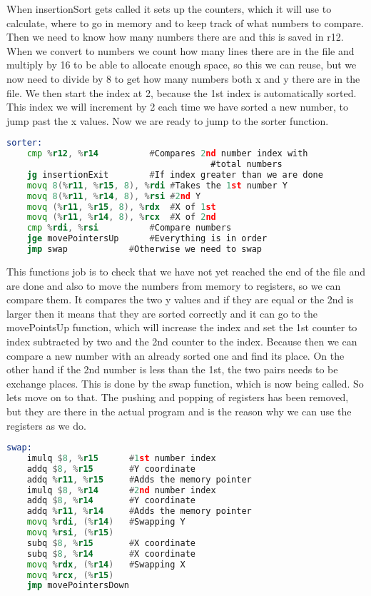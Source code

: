 \documentclass{article}
\begin{document}
When insertionSort gets called it sets up the counters, which it will use to calculate, where to  go in memory and to keep track of what numbers to compare. Then we need to know how many numbers there are and this is saved in r12. When we convert to numbers we count how many lines there are in the file and multiply by 16 to be able to allocate enough space, so this we can reuse, but we now need to divide by 8 to get how many numbers both x and y there are in the file. We then start the index at 2, because the 1st index is automatically sorted. This index we will increment by 2 each time we have sorted a new number, to jump past the x values. Now we are ready to jump to the sorter function.

\begin{lstlisting}[language=asm]
sorter:
	cmp %r12, %r14			#Compares 2nd number index with 
                                        #total numbers
	jg insertionExit		#If index greater than we are done
	movq 8(%r11, %r15, 8), %rdi	#Takes the 1st number Y
	movq 8(%r11, %r14, 8), %rsi	#2nd Y
	movq (%r11, %r15, 8), %rdx	#X of 1st
	movq (%r11, %r14, 8), %rcx	#X of 2nd
	cmp %rdi, %rsi			#Compare numbers
	jge movePointersUp		#Everything is in order
	jmp swap			#Otherwise we need to swap
\end{lstlisting}

This functions job is to check that we have not yet reached the end of the file and are done and also to move the numbers from memory to registers, so we can compare them. It compares the two y values and if they are equal or the 2nd is larger then it means that they are sorted correctly and it can go to the movePointsUp function, which will increase the index and set the 1st counter to index subtracted by two and the 2nd counter to the index. Because then we can compare a new number with an already sorted one and find its place. On the other hand if the 2nd number is less than the 1st, the two pairs needs to be exchange places. This is done by the swap function, which is now being called. So lets move on to that. The pushing and popping of registers has been removed, but they are there in the actual program and is the reason why we can use the registers as we do.

\begin{lstlisting}[language=asm]
swap:
	imulq $8, %r15 	    #1st number index
	addq $8, %r15	    #Y coordinate
	addq %r11, %r15	    #Adds the memory pointer
	imulq $8, %r14	    #2nd number index
	addq $8, %r14       #Y coordinate
	addq %r11, %r14	    #Adds the memory pointer
	movq %rdi, (%r14)   #Swapping Y 
	movq %rsi, (%r15)
	subq $8, %r15	    #X coordinate
	subq $8, %r14	    #X coordinate
	movq %rdx, (%r14)	#Swapping X
	movq %rcx, (%r15)
	jmp movePointersDown
\end{lstlisting}
\end{document}

